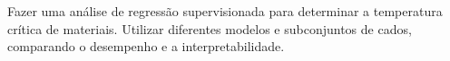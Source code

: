 Fazer uma análise de regressão supervisionada para determinar a temperatura crítica de materiais. Utilizar diferentes modelos e subconjuntos de cados, comparando o desempenho e a interpretabilidade.